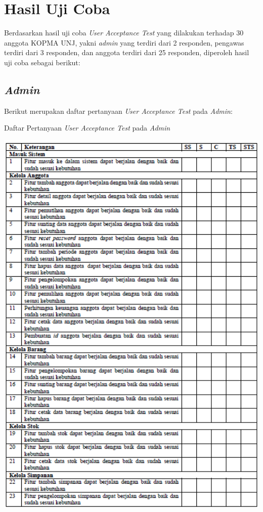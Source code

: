 \section{Hasil Uji Coba}
Berdasarkan hasil uji coba \textit{User Acceptance Test} yang dilakukan terhadap 30 anggota KOPMA UNJ, yakni \textit{admin} yang terdiri dari 2 responden, pengawas terdiri dari 3 responden, dan anggota terdiri dari 25 responden, diperoleh hasil uji coba sebagai berikut:

\subsection{\textit{Admin}}
Berikut merupakan daftar pertanyaan \textit{User Acceptance Test} pada \textit{Admin}:

\begin{table}[H]
	\centering
	\caption{Daftar Pertanyaan \textit{User Acceptance Test} pada \textit{Admin}}
	\includegraphics[width=1.0\textwidth]{gambar/Tabel_Admin1}
\end{table}

